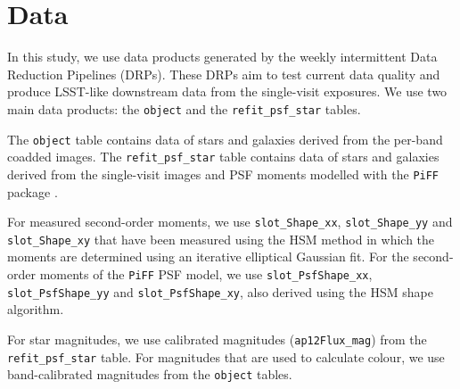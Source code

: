 \section{Data}
In this study, we use data products generated by the weekly intermittent Data Reduction Pipelines (DRPs). 
These DRPs aim to test current data quality and produce LSST-like downstream data from the single-visit exposures. 
We use two main data products: the \texttt{object} and the \texttt{refit\_psf\_star} tables.

The \texttt{object} table contains data of stars and galaxies derived from the per-band coadded images. 
The \texttt{refit\_psf\_star} table contains data of stars and galaxies derived from the single-visit images and PSF moments modelled with the \texttt{PiFF} package \citep{jarvis2021}.

For measured second-order moments, we use \texttt{slot\_Shape\_xx}, \texttt{slot\_Shape\_yy} and \texttt{slot\_Shape\_xy} that have been measured using the HSM method \citep{2003MNRAS.343..459H,2005MNRAS.361.1287M, 2018MNRAS.481.3170M} in which the moments are determined using an iterative elliptical Gaussian fit.
For the second-order moments of the \texttt{PiFF} PSF model, we use \texttt{slot\_PsfShape\_xx}, \texttt{slot\_PsfShape\_yy} and \texttt{slot\_PsfShape\_xy}, also derived using the HSM shape algorithm.

For star magnitudes, we use calibrated magnitudes (\texttt{ap12Flux\_mag}) from the \texttt{refit\_psf\_star} table. For magnitudes that are used to calculate colour, we use band-calibrated magnitudes from the \texttt{object} tables.
